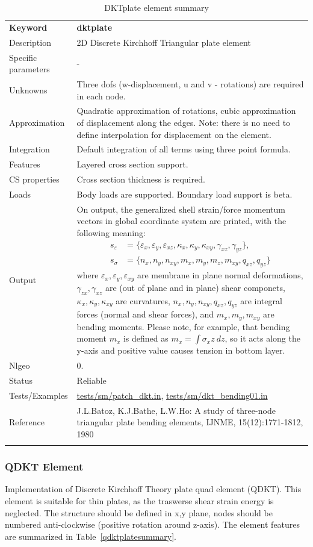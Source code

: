 \documentclass[a4paper]{article}
\newcommand{\param}[1]{\texttt{#1}} %
\newcommand{\templabel}{}%
\newcommand{\tempcaption}{}%
\newcounter{nelpar}
\newenvironment{elementsummary}[5]{%
  \gdef\tempcaption{#4}%
  \gdef\templabel{#5}%
  \setcounter{nelpar}{0}%
  \begin{center} %
    \begin{table}[!htb] %
      \begin{tabular}{|l|p{9cm}|}\hline %
        {\bf Keyword} & \bf{#1}\\ %
        {Description} & {#2}\\ %
        {Specific parameters} & {#3}\\ \hline %
}{
  \\ \hline %
      \end{tabular}%
      \caption{\tempcaption}%
      \label{\templabel}%
    \end{table}%
  \end{center}%
}
\newcommand{\elementParam}[1]{%
  \ifthenelse{\value{nelpar}>0} %
             {&{#1}}%
             {\setcounter{nelpar}{1}Parameters&{#1}}%
             \\%
}
\newcommand{\elementDescription}[2]{{#1} & {#2}\\}
\begin{document}
\begin{elementsummary}{dktplate}{2D Discrete Kirchhoff Triangular plate element}{-}{DKTplate element summary}{dktplatesummary}
\elementDescription{Unknowns}{Three dofs (w-displacement, u and v - rotations) are required in each node.}
\elementDescription{Approximation}{Quadratic approximation of rotations, cubic approximation of displacement along the edges. Note: there is no need to define interpolation for displacement on the element.}
\elementDescription{Integration}{Default integration of all terms using three point formula.}
\elementDescription{Features}{Layered cross section support.}
\elementDescription{CS properties}{Cross section thickness is required.}
\elementDescription{Loads}{Body loads are supported. Boundary load support is beta.}
\elementDescription{Output}{On output, the generalized shell strain/force momentum vectors in global coordinate system are printed, with the following meaning:
\begin{align*}
s_{\varepsilon} &= \{\varepsilon_x, \varepsilon_y, \varepsilon_{xz}, \kappa_x, \kappa_y, \kappa_{xy}, \gamma_{xz}, \gamma_{yz}\},\\
s_{\sigma} &= \{n_x, n_y, n_{xy}, m_x, m_y, m_z, m_{xy}, q_{xz}, q_{yz}\}
\end{align*}
where $\varepsilon_x, \varepsilon_y, \varepsilon_{xy}$ are membrane in plane normal deformations, $\gamma_{zx}, \gamma_{xz}$ are (out of plane and in plane) shear componets, $\kappa_x, \kappa_y, \kappa_{xy}$ are curvatures, $n_x, n_y, n_{xy}, q_{xz}, q_{yz}$ are integral forces (normal and shear forces), and $m_x, m_y, m_{xy}$ are bending moments. 
Please note, for example, that bending moment $m_x$ is defined as $m_x=\int \sigma_x z\ dz$, so it acts along the y-axis and positive value causes tension in bottom layer.}
\elementDescription{Nlgeo}{0.}
\elementDescription{Status}{Reliable}
\elementDescription{Tests/Examples}{\href{https://github.com/oofem/oofem/blob/devel/tests/sm/patch\_dkt.in}{tests/sm/patch\_dkt.in}, \href{https://github.com/oofem/oofem/blob/devel/tests/sm/dkt\_bending01.in}{tests/sm/dkt\_bending01.in}}
\elementDescription{Reference}{J.L.Batoz, K.J.Bathe, L.W.Ho: A study of three-node triangular plate bending elements, IJNME, 15(12):1771-1812, 1980}
\end{elementsummary}


\subsubsection {QDKT Element}
\label{qdkt}
Implementation of Discrete Kirchhoff Theory plate quad element (QDKT).
This element is suitable for thin plates, as the traswerse shear strain energy is neglected.
The structure should be defined in x,y plane, nodes should be numbered anti-clockwise (positive rotation around
z-axis). The element features are summarized in Table~\ref{qdktplatesummary}.
\end{document}
